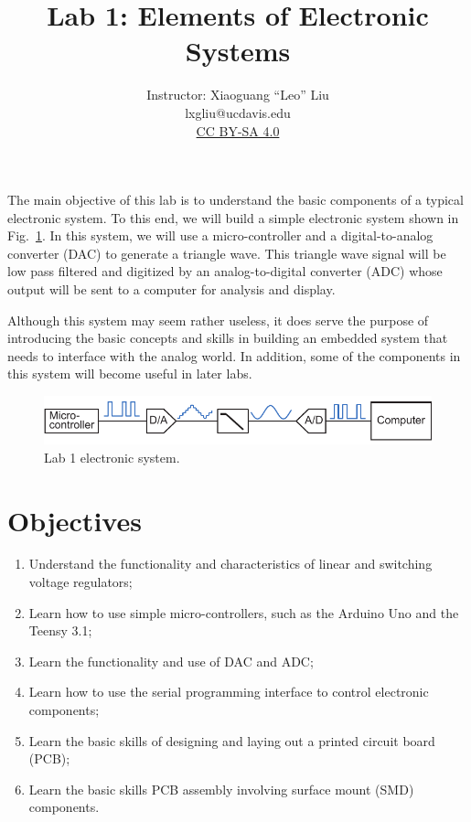 \documentclass[letterpaper, 11pt]{article}
\begin{document}
\title{Lab 1: Elements of Electronic Systems}
\author{Instructor: Xiaoguang ``Leo'' Liu\\lxgliu@ucdavis.edu \\
	\small \href{http://creativecommons.org/licenses/by-sa/4.0/}{CC BY-SA 4.0}}
\date{}

\maketitle

The main objective of this lab is to understand the basic components of a typical electronic system. To this end, we will build a simple electronic system shown in Fig.~\ref{fig:lab1-system}. In this system, we will use a micro-controller and a digital-to-analog converter (DAC) to generate a triangle wave. This triangle wave signal will be low pass filtered and digitized by an analog-to-digital converter (ADC) whose output will be sent to a computer for analysis and display.

Although this system may seem rather useless, it does serve the purpose of introducing the basic concepts and skills in building an embedded system that needs to interface with the analog world. In addition, some of the components in this system will become useful in later labs. 

\begin{figure}[h]
	\centering
	\includegraphics{lab1-system}
	\caption{Lab 1 electronic system.}
	\label{fig:lab1-system}
\end{figure}

\section{Objectives}

\begin{enumerate}[itemsep=0.1ex]
	\item Understand the functionality and characteristics of linear and switching voltage regulators;
	\item Learn how to use simple micro-controllers, such as the Arduino Uno and the Teensy 3.1;
	\item Learn the functionality and use of DAC and ADC;
	\item Learn how to use the serial programming interface to control electronic components;
	\item Learn the basic skills of designing and laying out a printed circuit board (PCB);
	\item Learn the basic skills PCB assembly involving surface mount (SMD) components.
\end{enumerate}
\end{document}
